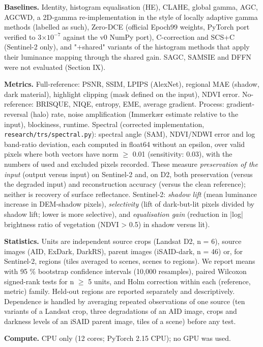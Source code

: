 \documentclass[conference]{IEEEtran}
\begin{document}
\textbf{Baselines.} Identity, histogram equalisation (HE), CLAHE, global gamma, AGC, AGCWD, a 2D-gamma re-implementation in the style of locally adaptive gamma methods (labelled as such), Zero-DCE (official Epoch99 weights, PyTorch port verified to 3$\times$$10^{-7}$ against the v0 NumPy port), C-correction and SCS+C (Sentinel-2 only), and "+shared" variants of the histogram methods that apply their luminance mapping through the shared gain. SAGC, SAMSIE and DFFN were not evaluated (Section IX).

\textbf{Metrics.} Full-reference: PSNR, SSIM, LPIPS (AlexNet), regional MAE (shadow, dark material), highlight clipping (mask defined on the input), NDVI error. No-reference: BRISQUE, NIQE, entropy, EME, average gradient. Process: gradient-reversal (halo) rate, noise amplification (Immerk{\ae}r estimate relative to the input), blockiness, runtime. Spectral (corrected implementation, \texttt{research/trs/spectral.py}): spectral angle (SAM), NDVI/NDWI error and log band-ratio deviation, each computed in float64 without an epsilon, over valid pixels where both vectors have norm $\geq$ 0.01 (sensitivity: 0.03), with the numbers of used and excluded pixels recorded. These measure \emph{preservation of the input} (output versus input) on Sentinel-2 and, on D2, both preservation (versus the degraded input) and reconstruction accuracy (versus the clean reference); neither is recovery of surface reflectance. Sentinel-2: \emph{shadow lift} (mean luminance increase in DEM-shadow pixels), \emph{selectivity} (lift of dark-but-lit pixels divided by shadow lift; lower is more selective), and \emph{equalisation gain} (reduction in |log| brightness ratio of vegetation (NDVI > 0.5) in shadow versus lit).

\textbf{Statistics.} Units are independent source crops (Landsat D2, n = 6), source images (AID, ExDark, DarkRS), parent images (iSAID-dark, n = 46) or, for Sentinel-2, regions (tiles averaged to scenes, scenes to regions). We report means with 95 \% bootstrap confidence intervals (10,000 resamples), paired Wilcoxon signed-rank tests for n $\geq$ 5 units, and Holm correction \cite{holm1979} within each (reference, metric) family. Held-out regions are reported separately and descriptively. Dependence is handled by averaging repeated observations of one source (ten variants of a Landsat crop, three degradations of an AID image, crops and darkness levels of an iSAID parent image, tiles of a scene) before any test.

\textbf{Compute.} CPU only (12 cores; PyTorch 2.15 CPU); no GPU was used.
\end{document}

